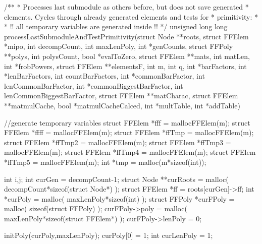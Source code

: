 \begin{ccode}[caption={Aus \url{../Sage/enumeratePCNs.c}},
  firstnumber=1030, label=lst:processLastSubmodule]
/**
 * Processes last submodule as others before, but does not save generated
 * elements. Cycles through already generated elements and tests for 
 * primitivity:
 *
 * !! all temporary variables are generated inside !!
 */
unsigned long long processLastSubmoduleAndTestPrimitivity(struct Node **roots,
        struct FFElem *mipo, int decompCount,
        int maxLenPoly, 
        int *genCounts, 
        struct FFPoly **polys, int polysCount, bool *evalToZero,
        struct FFElem **mats, int matLen, int *frobPowers,
        struct FFElem **elementsF,
        int m, int q, 
        int *barFactors, int *lenBarFactors, int countBarFactors,
        int *commonBarFactor, int lenCommonBarFactor,
        int *commonBiggestBarFactor, int lenCommonBiggestBarFactor,
        struct FFElem **matCharac,
        struct FFElem **matmulCache, bool *matmulCacheCalced,
        int *multTable, int *addTable){
    //generate temporary variables
    struct FFElem *fff = mallocFFElem(m);
    struct FFElem *ffff = mallocFFElem(m);
    struct FFElem *ffTmp = mallocFFElem(m);
    struct FFElem *ffTmp2 = mallocFFElem(m);
    struct FFElem *ffTmp3 = mallocFFElem(m);
    struct FFElem *ffTmp4 = mallocFFElem(m);
    struct FFElem *ffTmp5 = mallocFFElem(m);
    int *tmp = malloc(m*sizeof(int));

    int i,j;
    int curGen = decompCount-1;
    struct Node **curRoots = malloc( decompCount*sizeof(struct Node*) );
    struct FFElem *ff = roots[curGen]->ff;
    int *curPoly = malloc( maxLenPoly*sizeof(int) );
    struct FFPoly *curFPoly = malloc( sizeof(struct FFPoly) );
    curFPoly->poly = malloc( maxLenPoly*sizeof(struct FFElem*) );
    curFPoly->lenPoly = 0;
    
    initPoly(curPoly,maxLenPoly);
    curPoly[0] = 1;
    int curLenPoly = 1;

}
\end{ccode}
